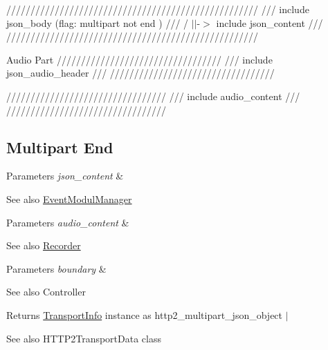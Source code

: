 //////////////////////////////////////////////////// /// include json\+\_\+body (flag\+: multipart not end ) /// / $\vert$$\vert$-\/$>$ include json\+\_\+content /// ////////////////////////////////////////////////////


\begin{DoxyEnumerate}
\item Audio Part ////////////////////////////////// /// include json\+\_\+audio\+\_\+header /// //////////////////////////////////
\end{DoxyEnumerate}

///////////////////////////////// /// include audio\+\_\+content /// /////////////////////////////////

\subsection*{Multipart End}


\begin{DoxyParams}{Parameters}
{\em json\+\_\+content} & \\
\hline
\end{DoxyParams}
\begin{DoxySeeAlso}{See also}
\hyperlink{classAlexaEvent_1_1EventModulManager}{Event\+Modul\+Manager} 
\end{DoxySeeAlso}

\begin{DoxyParams}{Parameters}
{\em audio\+\_\+content} & \\
\hline
\end{DoxyParams}
\begin{DoxySeeAlso}{See also}
\hyperlink{classAlexaEvent_1_1Recorder}{Recorder} 
\end{DoxySeeAlso}

\begin{DoxyParams}{Parameters}
{\em boundary} & \\
\hline
\end{DoxyParams}
\begin{DoxySeeAlso}{See also}
Controller 
\end{DoxySeeAlso}
\begin{DoxyReturn}{Returns}
\hyperlink{classAlexaEvent_1_1TransportInfo}{Transport\+Info} instance as http2\+\_\+multipart\+\_\+json\+\_\+object $\vert$ 
\end{DoxyReturn}
\begin{DoxySeeAlso}{See also}
H\+T\+T\+P2\+Transport\+Data class 
\end{DoxySeeAlso}
\mbox{\label{classAlexaEvent_1_1TransportMaker_a3bdf1b3d41417c3edd24769831457ebf}} 
